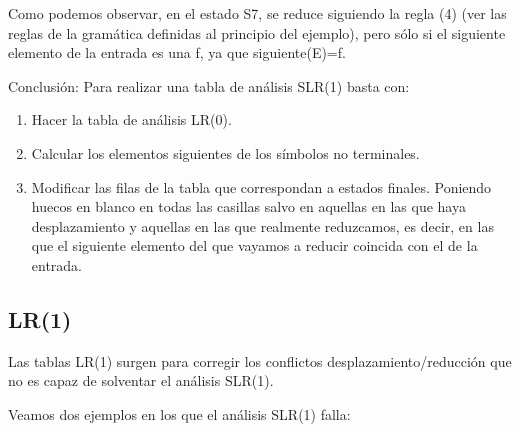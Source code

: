 \documentclass{apuntes}
\begin{document}
\begin{example}
Como podemos observar, en el estado S7, se reduce siguiendo la regla (4) (ver las reglas de la gramática definidas al principio del ejemplo), pero sólo si el siguiente elemento de la entrada es una f, ya que siguiente(E)={f}.

Conclusión: Para realizar una tabla de análisis SLR(1) basta con:
\begin{enumerate}
\item Hacer la tabla de análisis LR(0).
\item Calcular los elementos siguientes de los símbolos no terminales.
\item Modificar las filas de la tabla que correspondan a estados finales. Poniendo huecos en blanco en todas las casillas salvo en aquellas en las que haya desplazamiento y aquellas en las que realmente reduzcamos, es decir, en las que el siguiente elemento del que vayamos a reducir coincida con el de la entrada.
\end{enumerate}

\end{example}


\subsection{LR(1)}
Las tablas LR(1) surgen para corregir los conflictos desplazamiento/reducción que no es capaz de solventar el análisis SLR(1).

Veamos dos ejemplos en los que el análisis SLR(1) falla:
\end{document}
